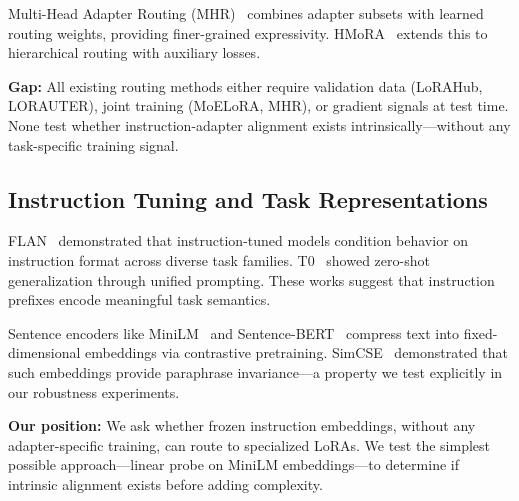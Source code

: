 Multi-Head Adapter Routing (MHR)~\cite{caccia2022mhr} combines adapter subsets with learned routing weights, providing finer-grained expressivity. HMoRA~\cite{liao2025hmora} extends this to hierarchical routing with auxiliary losses.

\textbf{Gap:} All existing routing methods either require validation data (LoRAHub, LORAUTER), joint training (MoELoRA, MHR), or gradient signals at test time. None test whether instruction-adapter alignment exists intrinsically---without any task-specific training signal.

\subsection{Instruction Tuning and Task Representations}

FLAN~\cite{wei2022flan} demonstrated that instruction-tuned models condition behavior on instruction format across diverse task families. T0~\cite{sanh2022t0} showed zero-shot generalization through unified prompting. These works suggest that instruction prefixes encode meaningful task semantics.

Sentence encoders like MiniLM~\cite{wang2020minilm} and Sentence-BERT~\cite{reimers2019sentencebert} compress text into fixed-dimensional embeddings via contrastive pretraining. SimCSE~\cite{gao2021simcse} demonstrated that such embeddings provide paraphrase invariance---a property we test explicitly in our robustness experiments.

\textbf{Our position:} We ask whether frozen instruction embeddings, without any adapter-specific training, can route to specialized LoRAs. We test the simplest possible approach---linear probe on MiniLM embeddings---to determine if intrinsic alignment exists before adding complexity.

